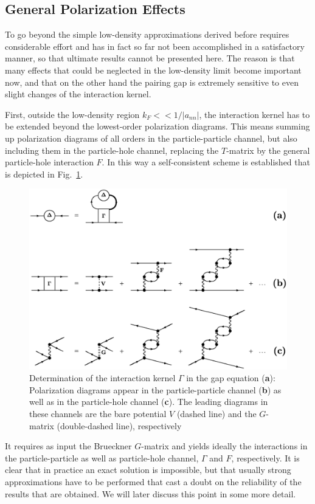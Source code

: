 \documentclass[runningheads]{svmult}
\def\ann{a_{nn}}
\begin{document}
\subsection{General Polarization Effects}
\label{s:pol}

To go beyond the simple low-density approximations derived before
requires considerable effort and has in fact so far not been accomplished in 
a satisfactory manner, so that ultimate results cannot be presented here.
The reason is that many effects that could be neglected in the low-density 
limit become important now, and that on the other hand the pairing gap
is extremely sensitive to even slight changes of the interaction kernel.

First, 
outside the low-density region $k_F<\!\!<1/|\ann|$,
the interaction kernel has to be extended beyond the 
lowest-order polarization diagrams. 
This means summing up polarization diagrams of all orders in the 
particle-particle channel, but also including them in the particle-hole
channel, replacing the $T$-matrix by the general particle-hole
interaction $F$.
In this way a self-consistent scheme is established that is depicted 
in Fig.~\ref{f:pol}.
\begin{figure}[h] %
\includegraphics[height=0.45\textheight,bb=-0 410 -0 820]{nsbk_pic.ps}
\caption[]{
Determination of the interaction kernel $\Gamma$ in the gap equation ({\bf a}):
Polarization diagrams appear in the particle-particle channel ({\bf b}) 
as well as in the particle-hole channel ({\bf c}).
The leading diagrams in these channels   
are the bare potential $V$ (dashed line) and the $G$-matrix (double-dashed
line), respectively}
\label{f:pol}
\end{figure} %
It requires as input the Brueckner $G$-matrix and yields ideally the
interactions in the particle-particle as well as particle-hole channel,
$\Gamma$ and $F$, respectively.
It is clear that in practice an exact solution is impossible, but that usually
strong approximations have to be performed that cast a doubt on the 
reliability of the results that are obtained.
We will later discuss this point in some more detail.
\end{document}
